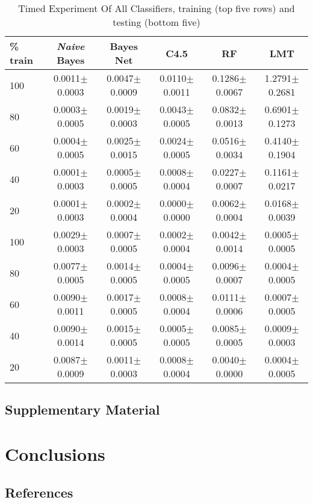 \documentclass{cmppgr}
\begin{document}
\begin{table*}[t]
	\centering
	\caption{Timed Experiment Of All Classifiers, training (top five rows) and testing (bottom five) }
	\begin{tabular}{|l|c|c|c|c|c|}
		\hline
		\% train &\textit{Naive} Bayes  &Bayes Net &C4.5&RF & LMT \\\hline\hline
		100    & 0.0011$\pm$0.0003 &   0.0047$\pm$0.0009 &    0.0110$\pm$0.0011 &   0.1286$\pm$0.0067 &   1.2791$\pm$0.2681 	\\
		80    & 0.0003$\pm$0.0005  &  0.0019$\pm$0.0003  &  0.0043$\pm$0.0005  &   0.0832$\pm$0.0013  &  0.6901$\pm$0.1273 \\
		60    &  0.0004$\pm$0.0005 &    0.0025$\pm$0.0015   &   0.0024$\pm$0.0005&    0.0516$\pm$0.0034&    0.4140$\pm$0.1904  \\
		40    &  0.0001$\pm$0.0003   &    0.0005$\pm$0.0005    &    0.0008$\pm$0.0004    &    0.0227$\pm$0.0007   &    0.1161$\pm$0.0217 	\\
		20    &  0.0001$\pm$0.0003&   0.0002$\pm$0.0004 &     0.0000$\pm$0.0000 &     0.0062$\pm$0.0004 &   0.0168$\pm$0.0039	\\\hline\hline 
		
			100    & 0.0029$\pm$0.0003  &   0.0007$\pm$0.0005  &  0.0002$\pm$0.0004 &   0.0042$\pm$0.0014   &   0.0005$\pm$0.0005 	\\
		80    & 0.0077$\pm$0.0005  &   0.0014$\pm$0.0005  &   0.0004$\pm$0.0005  &   0.0096$\pm$0.0007  &  0.0004$\pm$0.0005	\\
		60    &  0.0090$\pm$0.0011 &   0.0017$\pm$0.0005 &   0.0008$\pm$0.0004&   0.0111$\pm$0.0006 &   0.0007$\pm$0.0005	\\
		40    & 0.0090$\pm$0.0014 &   0.0015$\pm$0.0005  &   0.0005$\pm$0.0005  &   0.0085$\pm$0.0005   &   0.0009$\pm$0.0003 	\\
		20    &0.0087$\pm$0.0009  &   0.0011$\pm$0.0003  &  0.0008$\pm$0.0004  &   0.0040$\pm$0.0000  &    0.0004$\pm$0.0005 \\\hline 
		
	\end{tabular}
\end{table*}



\subsection{Supplementary Material}


\section{Conclusions}


\subsection{References}




\end{document}

